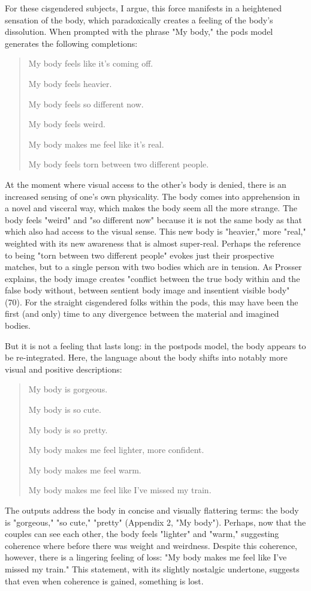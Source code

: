 \documentclass[11pt]{article}
\begin{document}
For these cisgendered subjects, I argue, this force manifests in a
heightened sensation of the body, which paradoxically creates a
feeling of the body's dissolution. When prompted with the phrase "My
body," the pods model generates the following completions:
\begin{quote}
My body feels like it's coming off.

My body feels heavier.

My body feels so different now.

My body feels weird.

My body makes me feel like it's real.

My body feels torn between two different people.
\end{quote}
At the moment where visual access to the other's body is denied, there
is an increased sensing of one's own physicality. The body comes into
apprehension in a novel and visceral way, which makes the body seem
all the more strange. The body feels "weird" and "so different now"
because it is not the same body as that which also had access to the
visual sense. This new body is "heavier," more "real," weighted with
its new awareness that is almost super-real. Perhaps the reference to
being "torn between two different people" evokes just their
prospective matches, but to a single person with two bodies which are
in tension. As Prosser explains, the body image creates "conflict
between the true body within and the false body without, between
sentient body image and insentient visible body" (70). For the
straight cisgendered folks within the pods, this may have been the
first (and only) time to any divergence between the material and
imagined bodies.

But it is not a feeling that lasts long: in the postpods model, the
body appears to be re-integrated. Here, the language about the body
shifts into notably more visual and positive descriptions:
\begin{quote}
My body is gorgeous.

My body is so cute.

My body is so pretty.

My body makes me feel lighter, more confident.

My body makes me feel warm.

My body makes me feel like I've missed my train.
\end{quote}
The outputs address the body in concise and visually flattering terms:
the body is "gorgeous," "so cute," "pretty" (Appendix 2, "My body").
Perhaps, now that the couples can see each other, the body feels
"lighter" and "warm," suggesting coherence where before there was
weight and weirdness. Despite this coherence, however, there is a
lingering feeling of loss: "My body makes me feel like I've missed my
train." This statement, with its slightly nostalgic undertone,
suggests that even when coherence is gained, something is lost.
\end{document}
